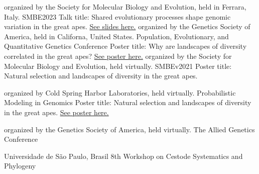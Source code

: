 		{%
			organized by the Society for Molecular Biology and Evolution, held in Ferrara, Italy.
        }
		{%
		    SMBE2023
        }
		{%
        Talk title: Shared evolutionary processes shape genomic variation in the great apes. \href{https://github.com/mufernando/smbe2023}{See slides here.}
        }
		{%
			organized by the Genetics Society of America, held in Californa, United States.
        }
		{%
		    Population, Evolutionary, and Quantitative Genetics Conference
        }
		{%
        Poster title: Why are landscapes of diversity correlated in the great apes? \href{https://github.com/mufernando/peqg2022}{See poster here.}
        }
		{%
			organized by the Society for Molecular Biology and Evolution, held virtually.
        }
		{%
		    SMBEv2021
        }
		{%
        Poster title: Natural selection and landscapes of diversity in the great apes.
        }

		{%
			organized by Cold Spring Harbor Laboratories, held virtually.
        }
		{%
		    Probabilistic Modeling in Genomics
        }
		{%
        Poster title: Natural selection and landscapes of diversity in the great apes. \href{https://github.com/mufernando/probgen21}{See poster here.}
        }

		{%
			organized by the Genetics Society of America, held virtually.
        }
		{%
		    The Allied Genetics Conference
        }
		{%
        }

		{%
			Universidade de São Paulo, Brasil
        }
		{%
		    8th Workshop on Cestode Systematics and Phylogeny
        }
		{%
        }

